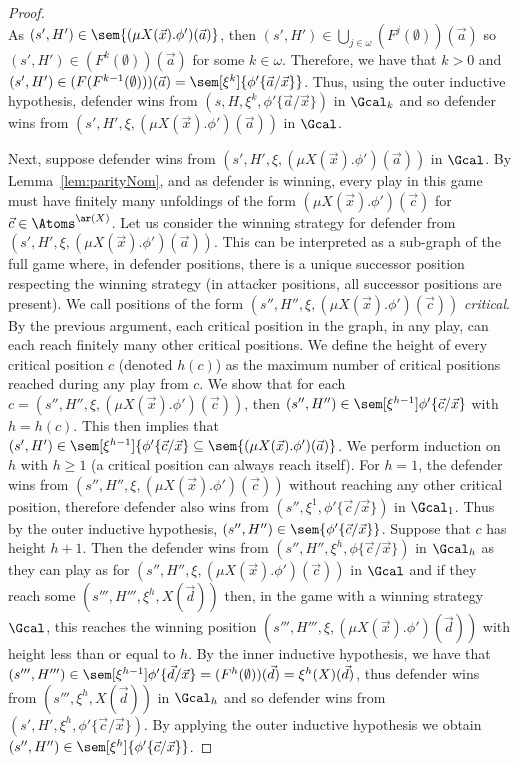 \begin{proof}
	\\
	As $(s', H') \in \sem{(\mu X(\vec x).\phi')(\vec a)}$, then $(s', H') \in \bigcup_{j \in \omega} (F^j(\emptyset))(\vec a)$ so $(s', H') \in (F^k(\emptyset))(\vec a)$ for some $k \in \omega$. 
	Therefore, we have that $k > 0$ and $(s', H') \in (F(F^{k - 1}(\emptyset)))(\vec a) = \sem[\xi^k]{\phi'\{\vec a / \vec x\}}$.
	Thus, using the outer inductive hypothesis, defender wins from $(s, H, \xi^k, \phi'\{\vec a / \vec x\})$ in $\Gcal_k$ and so defender wins from $(s', H', \xi, (\mu X(\vec x).\phi')(\vec a))$ in $\Gcal$.
	
	Next, suppose defender wins from $(s', H', \xi, (\mu X(\vec x).\phi')(\vec a))$ in $\Gcal$. 
	By Lemma~\ref{lem:parityNom}, and as defender is winning, every play in this game must have finitely many unfoldings of the form $(\mu X(\vec x).\phi')(\vec c)$ for $\vec c \in \Atoms^{\ar(X)}$.
	Let us consider the winning strategy for defender from $(s', H', \xi, (\mu X(\vec x).\phi')(\vec a))$.
	This can be interpreted as a sub-graph of the full game where, in defender positions, there is a unique successor position respecting the winning strategy (in attacker positions, all successor positions are present). 
	We call positions of the form $(s'', H'', \xi, (\mu X(\vec x).\phi')(\vec c))$ \emph{critical}. 
	By the previous argument, each critical position in the graph, in any play, can each reach finitely many other critical positions. 
	We define the height of every critical position $c$ (denoted $h(c)$) as the maximum number of critical positions reached during any play from $c$. 
	We show that for each $c = (s'', H'', \xi, (\mu X(\vec x).\phi')(\vec c))$, then $(s'', H'')\in \sem[\xi^{h-1}]{\phi'\{\vec c / \vec x\}}$ with $h = h(c)$. 
	This then implies that $(s', H') \in \sem[\xi^{h - 1}]{\{\phi'\{\vec c / \vec x\}} \subseteq \sem{(\mu X(\vec x).\phi')(\vec a)}$.
	We perform induction on $h$ with $h \ge 1$ (a critical position can always reach itself). 
	For $h = 1$, the defender wins from $(s'',H'', \xi, (\mu X(\vec x).\phi')(\vec c))$ without reaching any other critical position, therefore defender also wins from $(s'', \xi^1, \phi'\{\vec c / \vec x\})$ in $\Gcal_1$.
	Thus by the outer inductive hypothesis, $(s'', H'') \in \sem{\phi'\{\vec c / \vec x\}}$.
	Suppose that $c$ has height $h + 1$. 
	Then the defender wins from $(s'', H'', \xi^h, \phi\{\vec c / \vec x\})$ in $\Gcal_h$ as they can play as for $(s'',H'', \xi, (\mu X(\vec x).\phi')(\vec c))$ in $\Gcal$ and if they reach some $(s''', H''', \xi^h, X(\vec d))$ then, in the game with a winning strategy $\Gcal$, this reaches the winning position $(s''', H''', \xi, (\mu X(\vec x).\phi')(\vec d))$ with height less than or equal to $h$. 
	By the inner inductive hypothesis, we have that $(s''', H''')\in \sem[\xi^{h-1}]{\phi'\{\vec d / \vec x\}} = (F^h(\emptyset))(\vec d) = \xi^h(X)(\vec d)$, thus defender wins from $(s''', \xi^h, X(\vec d))$ in $\Gcal_h$ and so defender wins from $(s', H', \xi^h, \phi'\{\vec c / \vec x\})$. 
	By applying the outer inductive hypothesis we obtain $(s'', H'')\in \sem[\xi^h]{\phi'\{\vec c / \vec x\}}$.  
				

\end{proof}

